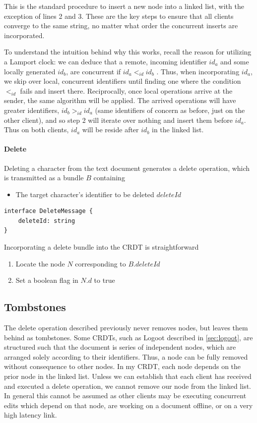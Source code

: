 \documentclass[12pt,a4paper,twoside,openright]{report}
\begin{document}
				This is the standard procedure to insert a new node into a linked list, with the exception of lines 2 and 3. These are the key steps to ensure that all clients converge to the same string, no matter what order the concurrent inserts are incorporated.
				
				To understand the intuition behind why this works, recall the reason for utilizing a Lamport clock: we can deduce that a remote, incoming identifier $id_a$ and some locally generated $id_b$, are concurrent if $id_a <_{id} id_b$ . Thus, when incorporating $id_a$, we skip over local, concurrent identifiers until finding one where the condition $<_{id}$ fails and insert there. Reciprocally, once local operations arrive at the sender, the same algorithm will be applied. The arrived operations will have greater identifiers, $id_b >_{id} id_a$ (same identifiers of concern as before, just on the other client), and so step 2 will iterate over nothing and insert them before $id_a$. Thus on both clients, $id_a$ will be reside after $id_b$ in the linked list.
				
			\paragraph{Delete}
				Deleting a character from the text document generates a delete operation, which is transmitted as a bundle $B$ containing
				\begin{itemize}
					\item The target character's identifier to be deleted $deleteId$
				\end{itemize}
				
\vspace{3mm}
\begin{lstlisting}[caption=Delete Bundle Type Signature]
interface DeleteMessage {
    deleteId: string
}
\end{lstlisting}				
				
				Incorporating a delete bundle into the CRDT is straightforward
				\begin{enumerate}
					\item Locate the node $N$ corresponding to $B.deleteId$
					\item Set a boolean flag in $N.d$ to true
				\end{enumerate}
				
		\subsection{Tombstones}
			The delete operation described previously never removes nodes, but leaves them behind as tombstones. Some CRDTs, such as Logoot described in \cref{sec:logoot}, are structured such that the document is series of independent nodes, which are arranged solely according to their identifiers. Thus, a node can be fully removed without consequence to other nodes. In my CRDT, each node depends on the prior node in the linked list. Unless we can establish that each client has received and executed a delete operation, we cannot remove our node from the linked list. In general this cannot be assumed as other clients may be executing concurrent edits which depend on that node, are working on a document offline, or on a very high latency link.
			
\end{document}
